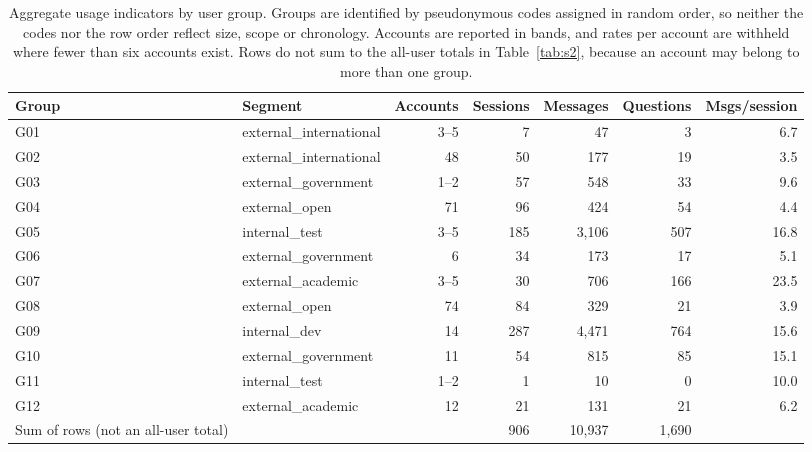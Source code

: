 \begin{table}[htbp]
\centering
\caption{Aggregate usage indicators by user group. Groups are identified by
pseudonymous codes assigned in random order, so neither the codes nor the row
order reflect size, scope or chronology. Accounts are reported in bands, and
rates per account are withheld where fewer than six accounts exist. Rows do
not sum to the all-user totals in Table~\ref{tab:s2}, because an account may
belong to more than one group.}
\label{tab:s1}
\begin{tabular}{llrrrrr}
\toprule
Group & Segment & Accounts & Sessions & Messages & Questions & Msgs/session \\
\midrule
G01 & external\_international & 3--5 & 7 & 47 & 3 & 6.7 \\
G02 & external\_international & 48 & 50 & 177 & 19 & 3.5 \\
G03 & external\_government & 1--2 & 57 & 548 & 33 & 9.6 \\
G04 & external\_open & 71 & 96 & 424 & 54 & 4.4 \\
G05 & internal\_test & 3--5 & 185 & 3,106 & 507 & 16.8 \\
G06 & external\_government & 6 & 34 & 173 & 17 & 5.1 \\
G07 & external\_academic & 3--5 & 30 & 706 & 166 & 23.5 \\
G08 & external\_open & 74 & 84 & 329 & 21 & 3.9 \\
G09 & internal\_dev & 14 & 287 & 4,471 & 764 & 15.6 \\
G10 & external\_government & 11 & 54 & 815 & 85 & 15.1 \\
G11 & internal\_test & 1--2 & 1 & 10 & 0 & 10.0 \\
G12 & external\_academic & 12 & 21 & 131 & 21 & 6.2 \\
\midrule
Sum of rows (not an all-user total) & & & 906 & 10,937 & 1,690 & \\
\bottomrule
\end{tabular}
\end{table}
